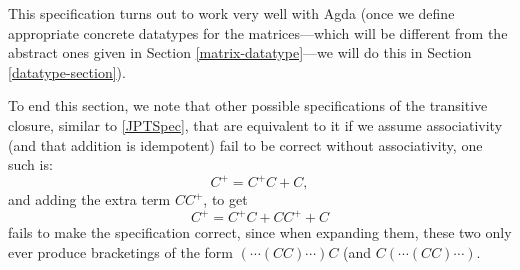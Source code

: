 This specification turns out to work very well with Agda (once we define appropriate concrete datatypes for the matrices---which will be different from the abstract ones given in Section \ref{matrix-datatype}---we will do this in Section \ref{datatype-section}).

To end this section, we note that other possible specifications of the transitive closure, similar to \eqref{JPTSpec}, that are equivalent to it if we assume associativity (and that addition is idempotent) fail to be correct without associativity, one such is:
\begin{equation}
  C^+ = C^+C + C,
\end{equation}
and adding the extra term $CC^+$, to get
\begin{equation}
  C^+ = C^+C + CC^+ + C
\end{equation}
fails to make the specification correct, since when expanding them, these two only ever produce bracketings of the form $(\cdots(CC)\cdots) C$ (and $C(\cdots(CC)\cdots)$.

\label{Section:Magma-multiplication}
